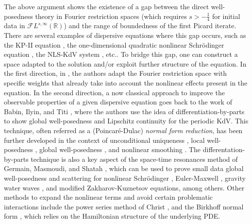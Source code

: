 \documentclass[a4paper,
11pt,  reqno]{amsart}
\newcommand{\5}{\textup{V}}
\theoremstyle{remark}
\newcommand{\R}{\mathbb{R}}
\numberwithin{equation}{section}
\numberwithin{theorem}{section}
\begin{document}
	\medskip
	The above argument shows the existence of a gap between the direct well-posedness theory in Fourier restriction spaces (which requires $s>-\frac14$ for initial data in $\mathcal{F}L^{s,\infty}(\R)$) and the range of boundedness of the first Picard iterate. There are several examples of dispersive equations where this gap occurs, such as the KP-II equation \cite{hadac, HHK_kpii}, the one-dimensional quadratic nonlinear Schrödinger equation \cite{taobejenaru, OS12}, the NLS-KdV system \cite{CLS}, etc..
To bridge this gap, one can construct a space adapted to the solution and/or exploit further structure of the equation. 
In the first direction, 
in \cite{taobejenaru, hadac, HHK_kpii}, the authors adapt the Fourier restriction space with specific weights that already take into account the nonlinear effects present in the equation.
In the second direction, a now classical approach to improve the observable properties of a given dispersive equation goes back to the work of Babin, Ilyin, and Titi \cite{bit}, where the authors use the idea of differentiation-by-parts to show global well-posedness and Lipschitz continuity for the periodic KdV. 
This technique, often referred as a (Poincaré-Dulac) \emph{normal form reduction}, 
has been further developed in the context of unconditional uniqueness \cite{GuoKwonOh_nls, kishimoto, KwonOh_uu_mkdv, KOY20}, local well-posedness \cite{CLS}, global well-posedness \cite{CGKO_normal_form, IfrimTataru}, and nonlinear smoothing \cite{CKV, CS20,  ErdoganTzirakis_kdv, ErdoganTzirakis_nls, McConnel_nls}.
The differentation-by-parts technique is also a key aspect of the space-time resonances method of Germain, Masmoudi, and Shatah \cite{GMS_nls_3d}, which can be used to prove small data global well-posedness and scattering for nonlinear Schr\"odinger \cite{katopusateri}, Euler-Maxwell \cite{GermainMasmoudi_euler_maxwell}, gravity water waves \cite{GMS_gravity}, and modified Zakharov-Kuznetsov \cite{anjolras} equations, among others. 
 Other methods to expand the nonlinear terms and avoid certain problematic interactions include the power series method of Christ \cite{Christ_power}, and the Birkhoff normal form \cite{Bambusi_birkhoff, bourg_birkhoff_normal, CollianderKwonOh_birkhoff}, which relies on the Hamiltonian structure of the underlying PDE.


\medskip 
\end{document}
